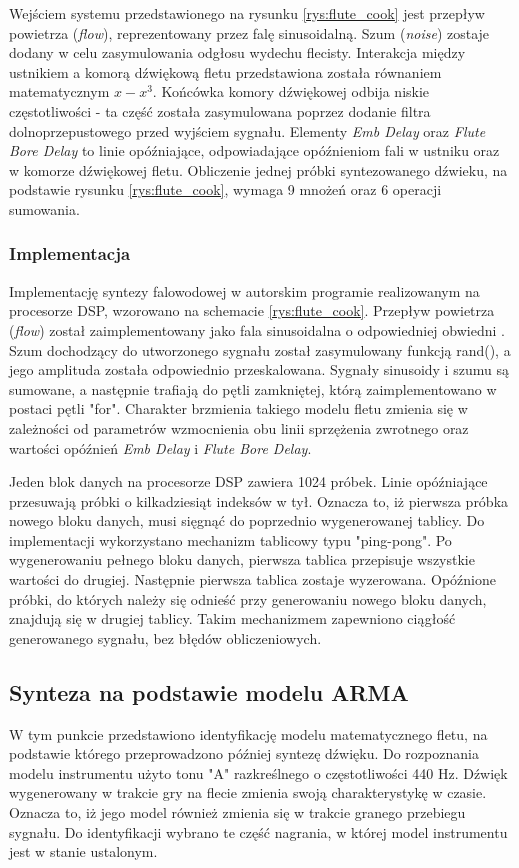 Wejściem systemu przedstawionego na rysunku \ref{rys:flute_cook} jest przepływ powietrza (\emph{flow}), reprezentowany przez falę sinusoidalną. Szum (\emph{noise}) zostaje dodany w celu zasymulowania odgłosu wydechu flecisty. 
Interakcja między ustnikiem a komorą dźwiękową fletu przedstawiona została równaniem matematycznym $x-x^3$. Końcówka komory dźwiękowej odbija niskie częstotliwości - ta część została zasymulowana poprzez dodanie filtra dolnoprzepustowego przed wyjściem sygnału. Elementy \emph{Emb Delay} oraz \emph{Flute Bore Delay} to linie opóźniające, odpowiadające opóźnieniom fali w ustniku oraz w komorze dźwiękowej fletu. 
Obliczenie jednej próbki syntezowanego dźwieku, na podstawie rysunku \ref{rys:flute_cook}, wymaga 9 mnożeń oraz 6 operacji sumowania.

\subsubsection{Implementacja}
Implementację syntezy falowodowej w autorskim programie realizowanym na procesorze DSP,  wzorowano na schemacie \ref{rys:flute_cook}. Przepływ powietrza (\emph{flow}) został zaimplementowany jako fala sinusoidalna o odpowiedniej obwiedni \cite{flute_prezka}. Szum dochodzący do utworzonego sygnału został zasymulowany funkcją rand(), a jego amplituda została odpowiednio przeskalowana. Sygnały sinusoidy i szumu są sumowane, a następnie trafiają do pętli zamkniętej, którą zaimplementowano w postaci pętli "for". Charakter brzmienia takiego modelu fletu zmienia się w zależności od parametrów wzmocnienia obu linii sprzężenia zwrotnego oraz wartości opóźnień \emph{Emb Delay} i \emph{Flute Bore Delay}.

Jeden blok danych na procesorze DSP zawiera 1024 próbek. Linie opóźniające przesuwają próbki o kilkadziesiąt indeksów w tył. Oznacza to, iż pierwsza próbka nowego bloku danych, musi sięgnąć do poprzednio wygenerowanej tablicy. Do implementacji wykorzystano mechanizm tablicowy typu "ping-pong". Po wygenerowaniu pełnego bloku danych, pierwsza tablica przepisuje wszystkie wartości do drugiej. Następnie pierwsza tablica zostaje wyzerowana. Opóźnione próbki, do których należy się odnieść przy generowaniu nowego bloku danych, znajdują się w drugiej tablicy. Takim mechanizmem zapewniono ciągłość generowanego sygnału, bez błędów obliczeniowych.

\subsection{Synteza na podstawie modelu ARMA}
W tym punkcie przedstawiono identyfikację modelu matematycznego fletu, na podstawie którego przeprowadzono później syntezę dźwięku. Do rozpoznania modelu instrumentu użyto tonu "A" razkreślnego o częstotliwości 440 Hz. Dźwięk wygenerowany w trakcie gry na flecie zmienia swoją charakterystykę w czasie. Oznacza to, iż jego model również zmienia się w trakcie granego przebiegu sygnału. Do identyfikacji wybrano te część nagrania, w której model instrumentu jest w stanie ustalonym.


